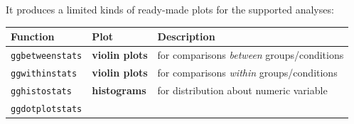 \documentclass[]{article}
\begin{document}
It produces a limited kinds of ready-made plots for the supported
analyses:

\begin{longtable}[]{@{}lll@{}}
\toprule
\begin{minipage}[b]{0.19\columnwidth}\raggedright
Function\strut
\end{minipage} & \begin{minipage}[b]{0.19\columnwidth}\raggedright
Plot\strut
\end{minipage} & \begin{minipage}[b]{0.54\columnwidth}\raggedright
Description\strut
\end{minipage}\tabularnewline
\midrule
\endhead
\begin{minipage}[t]{0.19\columnwidth}\raggedright
\texttt{ggbetweenstats}\strut
\end{minipage} & \begin{minipage}[t]{0.19\columnwidth}\raggedright
\textbf{violin plots}\strut
\end{minipage} & \begin{minipage}[t]{0.54\columnwidth}\raggedright
for comparisons \emph{between} groups/conditions\strut
\end{minipage}\tabularnewline
\begin{minipage}[t]{0.19\columnwidth}\raggedright
\texttt{ggwithinstats}\strut
\end{minipage} & \begin{minipage}[t]{0.19\columnwidth}\raggedright
\textbf{violin plots}\strut
\end{minipage} & \begin{minipage}[t]{0.54\columnwidth}\raggedright
for comparisons \emph{within} groups/conditions\strut
\end{minipage}\tabularnewline
\begin{minipage}[t]{0.19\columnwidth}\raggedright
\texttt{gghistostats}\strut
\end{minipage} & \begin{minipage}[t]{0.19\columnwidth}\raggedright
\textbf{histograms}\strut
\end{minipage} & \begin{minipage}[t]{0.54\columnwidth}\raggedright
for distribution about numeric variable\strut
\end{minipage}\tabularnewline
\begin{minipage}[t]{0.19\columnwidth}\raggedright
\texttt{ggdotplotstats}\strut
\end{minipage} & \begin{minipage}[t]{0.19\columnwidth}\raggedright

\end{minipage}
\end{longtable}
\end{document}
